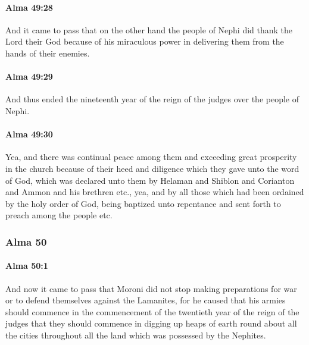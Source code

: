 		\paragraph{Alma 49:28} %
			\label{ALMA-49-28}

			And it came to pass that on the other hand
			the people of Nephi did thank the Lord their God
			because of his miraculous power in delivering them
			from the hands of their enemies.

		\paragraph{Alma 49:29} %
			\label{ALMA-49-29}

			And thus ended the nineteenth year
			of the reign of the judges over the people of Nephi.

		\paragraph{Alma 49:30} %
			\label{ALMA-49-30}

			Yea, and there was continual peace among them
			and exceeding great prosperity in the church
			because of their heed and diligence which they gave unto the word of God,
			which was declared unto them
			by Helaman and Shiblon and Corianton and Ammon and his brethren etc.,
			yea, and by all those which had been ordained by the holy order of God,
			being baptized unto repentance
			and sent forth to preach among the people etc.

	\subsubsection{Alma 50} %
		\label{ALMA-50}
		
		\paragraph{Alma 50:1} %
			\label{ALMA-50-1}

			And now it came to pass that
			Moroni did not stop making preparations for war
			or to defend themselves against the Lamanites,
			for he caused that his armies should commence
			in the commencement of the twentieth year of the reign of the judges
			that they should commence in digging up heaps of earth
			round about all the cities throughout all the land
			which was possessed by the Nephites.

